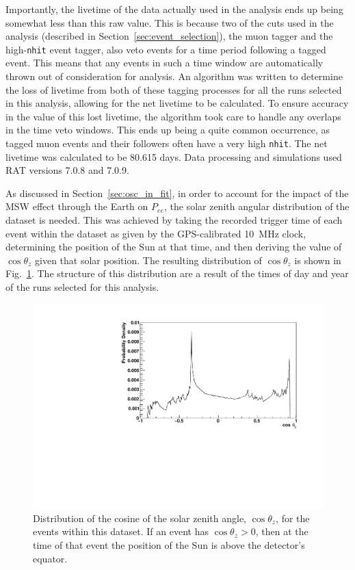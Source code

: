 Importantly, the livetime of the data actually used in the analysis ends up being somewhat less than this raw value. This is because two of the cuts used in the analysis (described in Section~\ref{sec:event_selection}), the muon tagger and the high-\texttt{nhit} event tagger, also veto events for a time period following a tagged event. This means that any events in such a time window are automatically thrown out of consideration for analysis. An algorithm was written to determine the loss of livetime from both of these tagging processes for all the runs selected in this analysis, allowing for the net livetime to be calculated. To ensure accuracy in the value of this lost livetime, the algorithm took care to handle any overlaps in the time veto windows. This ends up being a quite common occurrence, as tagged muon events and their followers often have a very high \texttt{nhit}. The net livetime was calculated to be 80.615 days. Data processing and simulations used RAT versions 7.0.8 and 7.0.9.

As discussed in Section~\ref{sec:osc_in_fit}, in order to account for the impact of the MSW effect through the Earth on $P_{ee}$, the solar zenith angular distribution of the dataset is needed. This was achieved by taking the recorded trigger time of each event within the dataset as given by the GPS-calibrated \SI{10}{\MHz} clock, determining the position of the Sun at that time, and then deriving the value of $\cos{\theta_{z}}$ given that solar position. The resulting distribution of $\cos{\theta_{z}}$ is shown in Fig.~\ref{fig:solar_zenith_distribution}. The structure of this distribution are a result of the times of day and year of the runs selected for this analysis.

\begin{figure}
    \centering
    \includegraphics[width=\textwidth]{6_SolarAnalysis/images/solar_zenith_dist.pdf}
    \caption[Distribution of $\cos{\theta_{z}}$, for the events within this dataset]
    {Distribution of the cosine of the solar zenith angle, $\cos{\theta_{z}}$, for the events within this dataset. If an event has $\cos{\theta_{z}}>0$, then at the time of that event the position of the Sun is above the detector's equator.}
    \label{fig:solar_zenith_distribution}
\end{figure}


